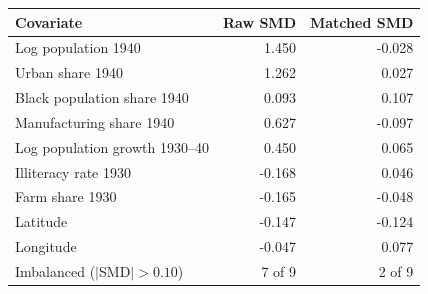 \begin{tabular}{lrr}
\toprule
Covariate & Raw SMD & Matched SMD \\
\midrule
Log population 1940 & 1.450 & -0.028 \\
Urban share 1940 & 1.262 & 0.027 \\
Black population share 1940 & 0.093 & 0.107 \\
Manufacturing share 1940 & 0.627 & -0.097 \\
Log population growth 1930--40 & 0.450 & 0.065 \\
Illiteracy rate 1930 & -0.168 & 0.046 \\
Farm share 1930 & -0.165 & -0.048 \\
Latitude & -0.147 & -0.124 \\
Longitude & -0.047 & 0.077 \\
\midrule
Imbalanced ($|$SMD$|>0.10$) & 7 of 9 & 2 of 9 \\
\bottomrule
\end{tabular}